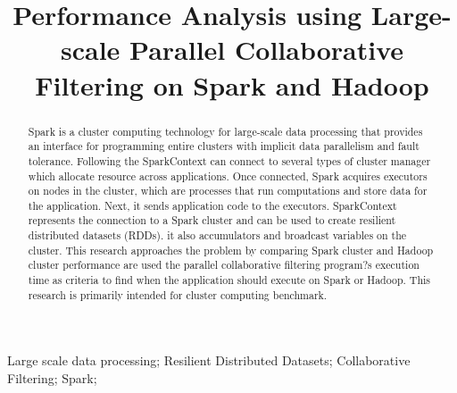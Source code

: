 \documentclass[conference]{IEEEtran}
\begin{document}
\title{Performance Analysis using Large-scale Parallel Collaborative Filtering on Spark and Hadoop}

\author{
\and
{}
}
\maketitle


\begin{abstract}
Spark is a cluster computing technology for large-scale data processing that provides an interface for programming entire clusters with implicit data parallelism and fault tolerance. Following the SparkContext can connect to several types of cluster manager which allocate resource across applications. Once connected, Spark acquires executors on nodes in the cluster, which are processes that run computations and store data for the application. Next, it sends application code to the executors. SparkContext represents the connection to a Spark cluster and can be used to create resilient distributed datasets (RDDs). it also accumulators and broadcast variables on the cluster. This research approaches the problem by comparing Spark cluster and Hadoop cluster performance are used the parallel collaborative filtering program?s execution time as criteria to find when the application should execute on Spark or Hadoop. This research is primarily intended for cluster computing benchmark.
\end{abstract}

\begin{IEEEkeywords}
Large scale data processing; Resilient Distributed Datasets; Collaborative Filtering; Spark;
\end{IEEEkeywords}
\end{document}
